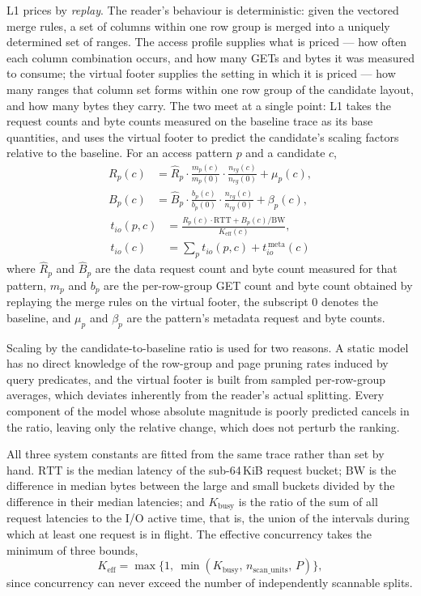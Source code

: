 L1 prices by \emph{replay}. The reader's behaviour is deterministic: given the
vectored merge rules, a set of columns within one row group is merged into a
uniquely determined set of ranges. The access profile supplies what is priced
--- how often each column combination occurs, and how many GETs and bytes it
was measured to consume; the virtual footer supplies the setting in which it is
priced --- how many ranges that column set forms within one row group of the
candidate layout, and how many bytes they carry. The two meet at a single
point: L1 takes the request counts and byte counts measured on the baseline
trace as its base quantities, and uses the virtual footer to predict the
candidate's scaling factors relative to the baseline. For an access pattern $p$
and a candidate $c$,
%
\begin{align}
R_p(c) &= \hat{R}_p \cdot \frac{m_p(c)}{m_p(0)}
          \cdot \frac{n_{rg}(c)}{n_{rg}(0)} + \mu_p(c), \label{eq:requests}\\[2pt]
B_p(c) &= \hat{B}_p \cdot \frac{b_p(c)}{b_p(0)}
          \cdot \frac{n_{rg}(c)}{n_{rg}(0)} + \beta_p(c), \label{eq:bytes}
\end{align}
\begin{align}
t_{io}(p,c)
  &= \frac{R_p(c)\cdot \mathrm{RTT} + B_p(c)/\mathrm{BW}}
           {K_{\mathrm{eff}}(c)}, \label{eq:tio-p}\\[2pt]
t_{io}(c)
  &= \sum_{p} t_{io}(p,c)
     + t_{io}^{\,\mathrm{meta}}(c)\label{eq:tio}
\end{align}
where $\hat{R}_p$ and $\hat{B}_p$ are the data request count and byte count
measured for that pattern, $m_p$ and $b_p$ are the per-row-group GET count and
byte count obtained by replaying the merge rules on the virtual footer, the
subscript $0$ denotes the baseline, and $\mu_p$ and $\beta_p$ are the pattern's
metadata request and byte counts.

Scaling by the candidate-to-baseline ratio is used for two reasons. A static
model has no direct knowledge of the row-group and page pruning rates induced
by query predicates, and the virtual footer is built from sampled per-row-group
averages, which deviates inherently from the reader's actual splitting. Every
component of the model whose absolute magnitude is poorly predicted cancels in
the ratio, leaving only the relative change, which does not perturb the
ranking.

All three system constants are fitted from the same trace rather than set by
hand. $\mathrm{RTT}$ is the median latency of the sub-64\,KiB request bucket;
$\mathrm{BW}$ is the difference in median bytes between the large and small
buckets divided by the difference in their median latencies; and
$K_{\mathrm{busy}}$ is the ratio of the sum of all request latencies to the I/O
active time, that is, the union of the intervals during which at least one
request is in flight. The effective concurrency takes the minimum of three
bounds,
%
\begin{equation}
K_{\mathrm{eff}} = \max\bigl\{1,\ \min(K_{\mathrm{busy}},\,
n_{\mathrm{scan\_units}},\, P)\bigr\},
\label{eq:keff}
\end{equation}
%
since concurrency can never exceed the number of independently scannable
splits.

